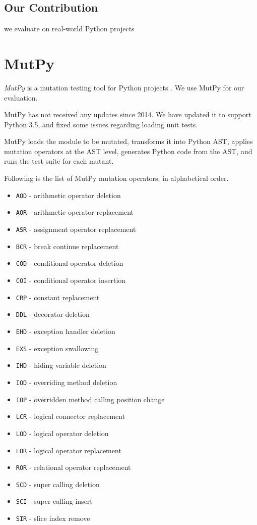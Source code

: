 \documentclass[12pt]{article}
\begin{document}
\subsection{Our Contribution}

we evaluate on real-world Python projects

\section{MutPy}

\emph{MutPy} is a mutation testing tool for Python projects \cite{mutpy}. We use MutPy for our evaluation.

MutPy has not received any updates since 2014. We have updated it to support Python 3.5, and fixed some issues regarding loading unit tests.

MutPy loads the module to be mutated, transforms it into Python AST, applies mutation operators at the AST level, generates Python code from the AST, and runs the test suite for each mutant.

Following is the list of MutPy mutation operators, in alphabetical order.

\begin{itemize}
  \itemsep0em 
  \item \texttt{AOD} - arithmetic operator deletion
  \item \texttt{AOR} - arithmetic operator replacement
  \item \texttt{ASR} - assignment operator replacement
  \item \texttt{BCR} - break continue replacement
  \item \texttt{COD} - conditional operator deletion
  \item \texttt{COI} - conditional operator insertion
  \item \texttt{CRP} - constant replacement
  \item \texttt{DDL} - decorator deletion
  \item \texttt{EHD} - exception handler deletion
  \item \texttt{EXS} - exception swallowing
  \item \texttt{IHD} - hiding variable deletion
  \item \texttt{IOD} - overriding method deletion
  \item \texttt{IOP} - overridden method calling position change
  \item \texttt{LCR} - logical connector replacement
  \item \texttt{LOD} - logical operator deletion
  \item \texttt{LOR} - logical operator replacement
  \item \texttt{ROR} - relational operator replacement
  \item \texttt{SCD} - super calling deletion
  \item \texttt{SCI} - super calling insert
  \item \texttt{SIR} - slice index remove
\end{itemize}
\end{document}
